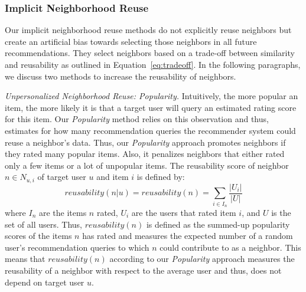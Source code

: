 \documentclass[manuscript,review,anonymous]{acmart}
\begin{document}
\subsubsection{Implicit Neighborhood Reuse}
\label{subsubsec:implicitreuse}
Our implicit neighborhood reuse methods do not explicitly reuse neighbors but create an artificial bias towards selecting those neighbors in all future recommendations.
They select neighbors based on a trade-off between similarity and reusability as outlined in Equation~\ref{eq:tradeoff}.
In the following paragraphs, we discuss two methods to increase the reusability of neighbors.

\vspace{2mm} \noindent \emph{Unpersonalized Neighborhood Reuse: Popularity.}
Intuitively, the more popular an item, the more likely it is that a target user will query an estimated rating score for this item.
Our \emph{Popularity} method relies on this observation and thus, estimates for how many recommendation queries the recommender system could reuse a neighbor's data.
Thus, our \emph{Popularity} approach promotes neighbors if they rated many popular items.
Also, it penalizes neighbors that either rated only a few items or a lot of unpopular items. 
The reusability score of neighbor $n \in N_{u, i}$ of target user $u$ and item $i$ is defined by:
\begin{equation}
    reusability(n|u) = reusability(n) = \sum_{i \in I_n} \frac{|U_i|}{|U|} \label{eq:popularity}
\end{equation}
where $I_n$ are the items $n$ rated, $U_i$ are the users that rated item $i$, and $U$ is the set of all users.
Thus, $reusability(n)$ is defined as the summed-up popularity scores of the items $n$ has rated and measures the expected number of a random user's recommendation queries to which $n$ could contribute to as a neighbor. 
This means that $reusability(n)$ according to our \emph{Popularity} approach measures the reusability of a neighbor with respect to the average user and thus, does not depend on target user $u$. 
\end{document}
